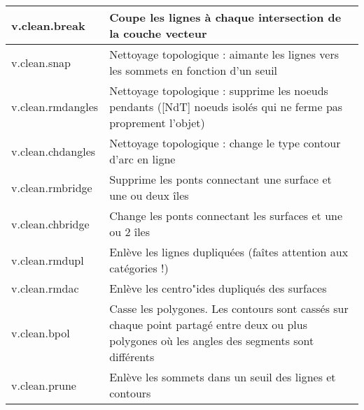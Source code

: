 \begin{center}
{\begin{longtable}{|p{2.5cm}|p{11.5cm}|}
  \hline v.clean.break & Coupe les lignes à chaque intersection de la couche vecteur\\
  \hline v.clean.snap & Nettoyage topologique : aimante les lignes vers les sommets en fonction d'un seuil\\
  \hline v.clean.rmdangles & Nettoyage topologique : supprime les noeuds pendants ([NdT] noeuds isolés qui ne ferme pas proprement l'objet) \\
  \hline v.clean.chdangles & Nettoyage topologique : change le type contour d'arc en ligne \\
  \hline v.clean.rmbridge & Supprime les ponts connectant une surface et une ou deux îles\\
  \hline v.clean.chbridge & Change les ponts connectant les surfaces et une ou 2 îles \\
  \hline v.clean.rmdupl & Enlève les lignes dupliquées  (faîtes attention aux catégories !) \\
  \hline v.clean.rmdac & Enlève les centro"ides dupliqués des surfaces\\
  \hline v.clean.bpol & Casse les polygones. Les contours sont cassés sur chaque point partagé entre deux ou plus polygones où les angles des segments sont différents\\
  \hline v.clean.prune & Enlève les sommets dans un seuil des lignes et contours\\

\end{longtable}}
\end{center}

